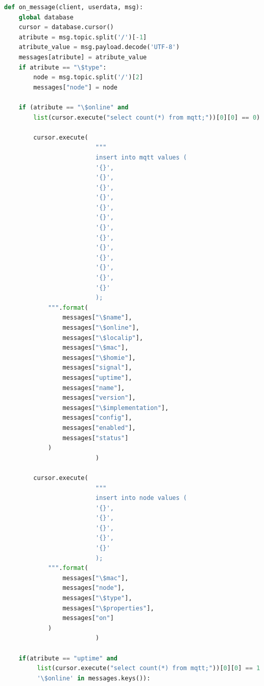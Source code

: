 \documentclass[times, utf8, zavrsni]{fer}
\begin{document}
\begin{lstlisting}[language=Python, caption=Parsiranje poruka i spremanje u bazu podataka]
def on_message(client, userdata, msg):
    global database
    cursor = database.cursor()
    atribute = msg.topic.split('/')[-1]
    atribute_value = msg.payload.decode('UTF-8')
    messages[atribute] = atribute_value
    if atribute == "\$type":
        node = msg.topic.split('/')[2]
        messages["node"] = node

    if (atribute == "\$online" and
        list(cursor.execute("select count(*) from mqtt;"))[0][0] == 0):

        cursor.execute(
                         """
                         insert into mqtt values (
                         '{}',
                         '{}',
                         '{}',
                         '{}',
                         '{}',
                         '{}',
                         '{}',
                         '{}',
                         '{}',
                         '{}',
                         '{}',
                         '{}',
                         '{}'
                         );
            """.format(
                messages["\$name"],
                messages["\$online"],
                messages["\$localip"],
                messages["\$mac"],
                messages["\$homie"],
                messages["signal"],
                messages["uptime"],
                messages["name"],
                messages["version"],
                messages["\$implementation"],
                messages["config"],
                messages["enabled"],
                messages["status"]
            )
                         )

        cursor.execute(
                         """
                         insert into node values (
                         '{}',
                         '{}',
                         '{}',
                         '{}',
                         '{}'
                         );
            """.format(
                messages["\$mac"],
                messages["node"],
                messages["\$type"],
                messages["\$properties"],
                messages["on"]
            )
                         )

    if(atribute == "uptime" and
         list(cursor.execute("select count(*) from mqtt;"))[0][0] == 1 and
         '\$online' in messages.keys()):


\end{lstlisting}
\end{document}
